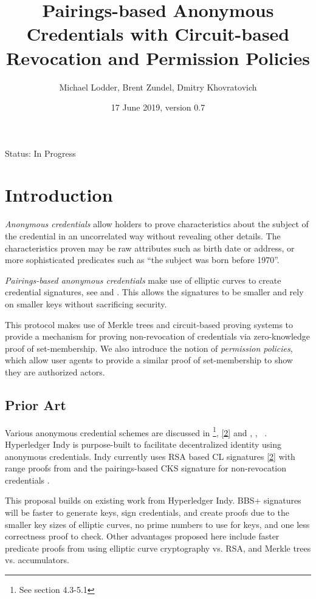 \documentclass[a4paper]{article}
\title{Pairings-based Anonymous Credentials with Circuit-based Revocation and Permission Policies}
\author{Michael Lodder, Brent Zundel, Dmitry Khovratovich}
\date{17 June 2019, version 0.7}
\begin{document}
\maketitle
\large{Status: In Progress}

\section{Introduction}
\emph{Anonymous credentials} allow holders to prove characteristics about the subject of the credential in an uncorrelated way without revealing other details. The characteristics proven may be raw attributes such as birth date or address, or more sophisticated predicates such as ``the subject was born before 1970''. 

\emph{Pairings-based anonymous credentials} make use of elliptic curves to create credential signatures, see \cite{CamenischDL16} and \cite{SBBD}. This allows the signatures to be smaller and rely on smaller keys without sacrificing security.

This protocol makes use of Merkle trees and circuit-based proving systems to provide a mechanism for proving non-revocation of credentials via zero-knowledge proof of set-membership. We also introduce the notion of \emph{permission policies}, which allow user agents to provide a similar proof of set-membership to show they are authorized actors.

\subsection{Prior Art}
Various anonymous credential schemes are discussed in \cite{CamenischDL16}\footnote{See section 4.3-5.1}, \href{https://domino.research.ibm.com/library/cyberdig.nsf/1e4115aea78b6e7c85256b360066f0d4/eeb54ff3b91c1d648525759b004fbbb1?OpenDocument}{[2]} and \cite{SBBD}, \cite{CamenischKS09}, ~\cite{CamenischL02}. Hyperledger Indy is purpose-built to facilitate decentralized identity using anonymous credentials. Indy currently uses RSA based CL signatures  \href{https://domino.research.ibm.com/library/cyberdig.nsf/1e4115aea78b6e7c85256b360066f0d4/eeb54ff3b91c1d648525759b004fbbb1?OpenDocument}{[2]} with range proofs from \cite{CamChaShe08} and the pairings-based CKS signature for non-revocation credentials \cite{CamenischKS09}.

This proposal builds on existing work from Hyperledger Indy. BBS+ signatures will be faster to generate keys, sign credentials, and create proofs due to the smaller key sizes of elliptic curves, no prime numbers to use for keys, and one less correctness proof to check. Other advantages proposed here include faster predicate proofs from using elliptic curve cryptography vs. RSA, and Merkle trees vs. accumulators. 
\end{document}
